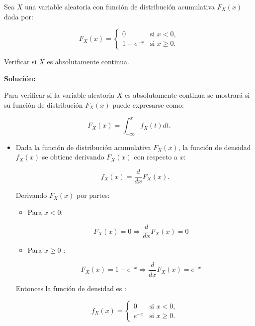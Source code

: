 \documentclass[
  us-letterpaper,
]{scrreprt}
\theoremstyle{plain}
\theoremstyle{plain}
\theoremstyle{definition}
\theoremstyle{remark}
\begin{document}
\begin{tcolorbox}[enhanced jigsaw, titlerule=0mm, opacityback=0, coltitle=black, bottomrule=.15mm, colbacktitle=quarto-callout-caution-color!10!white, toprule=.15mm, colback=white, arc=.35mm, colframe=quarto-callout-caution-color-frame, leftrule=.75mm, bottomtitle=1mm, left=2mm, toptitle=1mm, opacitybacktitle=0.6, breakable, title={Ejemplo (\textbf{\emph{Variable aleatoria continua}})}, rightrule=.15mm]

Sea \(X\) una variable aleatoria con función de distribución acumulativa
\(F_X(x)\) dada por:

\[F_X(x) = \begin{cases} 0 & \text{si } x < 0, \\ 1 - e^{-x} & \text{si } x \geq 0. \end{cases}\]\hspace{0pt}

Verificar si \(X\) es absolutamente continua.

\textbf{Solución:}

Para verificar si la variable aleatoria \(X\) es absolutamente continua
se mostrará si su función de distribución \(F_X(x)\) puede expresarse
como:

\[
F_X(x) = \int_{-\infty}^x f_X(t)dt.
\]

\begin{itemize}
\item
  Dada la función de distribución acumulativa \(F_X(x)\), la función de
  densidad \(f_X(x)\) se obtiene derivando \(F_X(x)\) con respecto a
  \(x\):

  \[
  f_X(x) = \frac{d}{dx}F_X(x).
  \]

  Derivando \(F_X(x)\) por partes:

  \begin{itemize}
  \item
    Para \(x<0\):

    \[F_X(x) = 0 \Rightarrow \frac{d}{dx}F_X(x)= 0 \]
  \item
    Para \(x\geq 0\) :

    \[
    F_X(x) = 1 - e^{-x} \Rightarrow \frac{d}{dx}F_X(x) = e^{-x}
    \]
  \end{itemize}

  Entonces la función de densidad es :

  \[f_X(x) = \begin{cases} 0 & \text{si } x < 0, \\ e^{-x} & \text{si } x \geq 0. \end{cases}\]
\end{itemize}


\end{tcolorbox}
\end{document}
